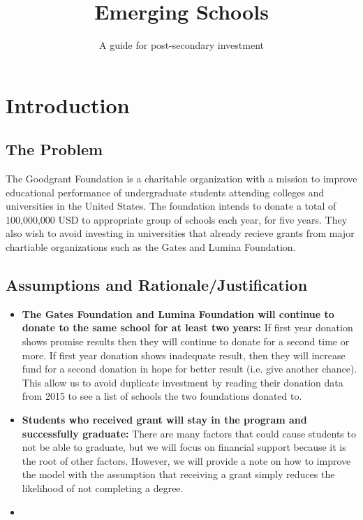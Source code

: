 \documentclass[12pt]{scrartcl}
\title{Emerging Schools}
\subtitle{A guide for post-secondary investment}
\begin{document}
\maketitle

\setcounter{page}{1}	

\section{Introduction}
	\subsection{The Problem}
		The Goodgrant Foundation is a charitable organization with a mission to improve educational performance of undergraduate students attending colleges and universities in the United States. The foundation intends to donate a total of 100,000,000 USD to appropriate group of schools each year, for five years. They also wish to avoid investing in universities that already recieve grants from major chartiable organizations such as the Gates and Lumina Foundation.
	
	\subsection{Assumptions and Rationale/Justification}
	\begin{itemize}
		\item \textbf{The Gates Foundation and Lumina Foundation will continue to donate to the same school for at least two years:} If first year donation shows promise results then they will continue to donate for a second time or more. If first year donation shows inadequate result, then they will increase fund for a second donation in hope for better result (i.e. give another chance). This allow us to avoid duplicate investment by reading their donation data from 2015 to see a list of schools the two foundations donated to. 
				
		\item \textbf{Students who received grant will stay in the program and successfully graduate:} There are many factors that could cause students to not be able to graduate, but we will focus on financial support because it is the root of other factors. However, we will provide a note on how to improve the model with the assumption that receiving a grant simply reduces the likelihood of not completing  a degree.

		\item \textbf{} 
	\end{itemize}
\clearpage
\end{document}
